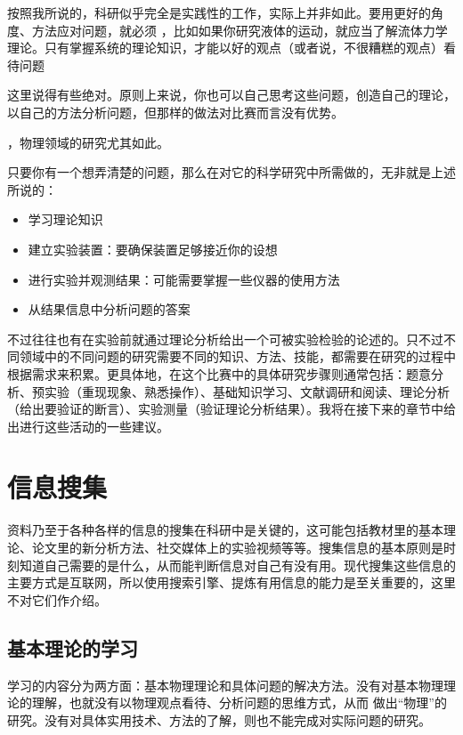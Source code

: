 \documentclass[a4paper,10pt,english]{sphinxmanual}
\begin{document}
按照我所说的，科研似乎完全是实践性的工作，实际上并非如此。要用更好的角度、方法应对问题，就必须  ，比如如果你研究液体的运动，就应当了解流体力学理论。只有掌握系统的理论知识，才能以好的观点（或者说，不很糟糕的观点）看待问题 %
\begin{footnote}[1]\sphinxAtStartFootnote
这里说得有些绝对。原则上来说，你也可以自己思考这些问题，创造自己的理论，以自己的方法分析问题，但那样的做法对比赛而言没有优势。
%
\end{footnote} ，物理领域的研究尤其如此。

只要你有一个想弄清楚的问题，那么在对它的科学研究中所需做的，无非就是上述所说的：
\begin{itemize}
\item {} 
学习理论知识

\item {} 
建立实验装置：要确保装置足够接近你的设想

\item {} 
进行实验并观测结果：可能需要掌握一些仪器的使用方法

\item {} 
从结果信息中分析问题的答案

\end{itemize}

不过往往也有在实验前就通过理论分析给出一个可被实验检验的论述的。只不过不同领域中的不同问题的研究需要不同的知识、方法、技能，都需要在研究的过程中根据需求来积累。更具体地，在这个比赛中的具体研究步骤则通常包括：题意分析、预实验（重现现象、熟悉操作）、基础知识学习、文献调研和阅读、理论分析（给出要验证的断言）、实验测量（验证理论分析结果）。我将在接下来的章节中给出进行这些活动的一些建议。


\chapter{信息搜集}
\label{\detokenize{4. GetInfo:id1}}\label{\detokenize{4. GetInfo::doc}}
资料乃至于各种各样的信息的搜集在科研中是关键的，这可能包括教材里的基本理论、论文里的新分析方法、社交媒体上的实验视频等等。搜集信息的基本原则是时刻知道自己需要的是什么，从而能判断信息对自己有没有用。现代搜集这些信息的主要方式是互联网，所以使用搜索引擎、提炼有用信息的能力是至关重要的，这里不对它们作介绍。


\section{基本理论的学习}
\label{\detokenize{4. GetInfo:id2}}
学习的内容分为两方面：基本物理理论和具体问题的解决方法。没有对基本物理理论的理解，也就没有以物理观点看待、分析问题的思维方式，从而  做出“物理”的研究。没有对具体实用技术、方法的了解，则也不能完成对实际问题的研究。
\end{document}
